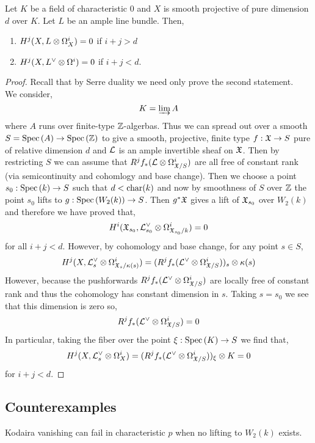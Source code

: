 \documentclass[12pt]{article}
\begin{document}
\begin{thm}
Let $K$ be a field of characteristic $0$ and $X$ is smooth projective of pure dimension $d$ over $K$. Let $L$ be an ample line bundle. Then,
\begin{enumerate}
\item $H^j(X, L \otimes \Omega_X^i) = 0$ if $i + j > d$
\item $H^j(X, L^{\vee} \otimes \Omega^i) = 0$ if $i + j < d$.
\end{enumerate}
\end{thm}

\begin{proof}
Recall that by Serre duality we need only prove the second statement.
\bigskip\\
We consider,
\[ K = \varinjlim A \]
where $A$ runs over finite-type $\mathbb{Z}$-algerbas. Thus we can spread out over a smooth $S = \mathrm{Spec}\left( A \right) \to \mathrm{Spec}\left( \mathbb{Z} \right)$ to give a smooth, projective, finite type $f : \mathfrak{X} \to S$ pure of relative dimension $d$ and $\mathcal{L}$ is an ample invertible sheaf on $\mathfrak{X}$. Then by restricting $S$ we can assume that $R^j f_* (\mathcal{L} \otimes \Omega^i_{\mathfrak{X}/S})$ are all free of constant rank (via semicontinuity and cohomlogy and base change). Then we choose a point $s_0 : \mathrm{Spec}\left( k \right) \to S$ such that $d < \operatorname{\mathrm{char}}(k)$ and now by smoothness of $S$ over $\mathbb{Z}$ the point $s_0$ lifts to $g : \mathrm{Spec}\left( W_2(k) \right) \to S$. Then $g^* \mathfrak{X}$ gives a lift of $\mathfrak{X}_{s_0}$ over $W_2(k)$ and therefore we have proved that,
\[ H^i(\mathfrak{X}_{s_0}, \mathcal{L}^{\vee}_{s_0} \otimes \Omega^i_{\mathfrak{X}_{s_0}/k}) = 0 \]
for all $i + j < d$. However, by cohomology and base change, for any point $s \in S$,
\[ H^j(X, \mathcal{L}^\vee_s \otimes \Omega^i_{\mathfrak{X}_s/\kappa(s)}) = (R^j f_* (\mathcal{L}^\vee \otimes \Omega^i_{\mathfrak{X}/S}))_s \otimes \kappa(s) \]
However, because the pushforwards $R^j f_* (\mathcal{L}^\vee \otimes \Omega^i_{\mathfrak{X}/S})$ are locally free of constant rank and thus the cohomology has constant dimension in $s$. Taking $s = s_0$ we see that this dimension is zero so,
\[ R^j f_* (\mathcal{L}^\vee \otimes \Omega^i_{\mathfrak{X} / S}) = 0 \]
In particular, taking the fiber over the point $\xi : \mathrm{Spec}\left( K \right) \to S$ we find that,
\[ H^j(X, \mathcal{L}_s^{\vee} \otimes \Omega^i_{X}) = (R^j f_* (\mathcal{L}^\vee \otimes \Omega^i_{\mathfrak{X}/S}))_\xi \otimes K = 0 \]
for $i + j < d$.
\end{proof}

\subsection{Counterexamples}

\begin{thm}[Raynaud]
Kodaira vanishing can fail in characteristic $p$ when no lifting to $W_2(k)$ exists.
\end{thm}
\end{document}
